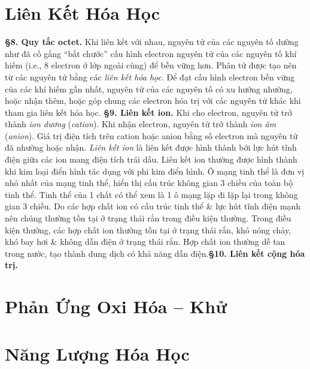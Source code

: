 \documentclass{article}
\numberwithin{equation}{section}
\begin{document}
\section{Liên Kết Hóa Học}
\textbf{\S8. Quy tắc octet.} Khi liên kết với nhau, nguyên tử của các nguyên tố dường như đã cố gắng ``bắt chước'' cấu hình electron nguyên tử của các nguyên tố khí hiếm (i.e., 8 electron ở lớp ngoài cùng) để bền vững hơn. Phân tử được tạo nên từ các nguyên tử bằng các \textit{liên kết hóa học}. Để đạt cấu hình electron bền vững của các khí hiếm gần nhất, nguyên tử của các nguyên tố có xu hướng nhường, hoặc nhận thêm, hoặc góp chung các electron hóa trị với các nguyên tử khác khi tham gia liên kết hóa học. \textbf{\S9. Liên kết ion.} Khi cho electron, nguyên tử trở thành \textit{ion dương} (\textit{cation}). Khi nhận electron, nguyên tử trở thành \textit{ion âm} (\textit{anion}). Giá trị điện tích trên cation hoặc anion bằng số electron mà nguyên tử đã nhường hoặc nhận. \emph{Liên kết ion} là liên kết được hình thành bởi lực hút tĩnh điện giữa các ion mang điện tích trái dấu. Liên kết ion thường được hình thành khi kim loại điển hình tác dụng với phi kim điển hình. Ô mạng tinh thể là đơn vị nhỏ nhất của mạng tinh thể, hiển thị cấu trúc không gian 3 chiều của toàn bộ tinh thể. Tinh thể của 1 chất có thể xem là 1 ô mạng lặp đi lặp lại trong không gian 3 chiều. Do các hợp chất ion có cấu trúc tinh thể \& lực hút tĩnh điện mạnh nên chúng thường tồn tại ở trạng thái rắn trong điều kiện thường. Trong điều kiện thường, các hợp chất ion thường tồn tại ở trạng thái rắn, khó nóng chảy, khó bay hơi \& không dẫn điện ở trạng thái rắn. Hợp chất ion thường dễ tan trong nước, tạo thành dung dịch có khả năng dẫn điện.\newpage\textbf{\S10. Liên kết cộng hóa trị.}


\section{Phản Ứng Oxi Hóa -- Khử}


\section{Năng Lượng Hóa Học}


\printbibliography[heading=bibintoc]	
	
\end{document}
